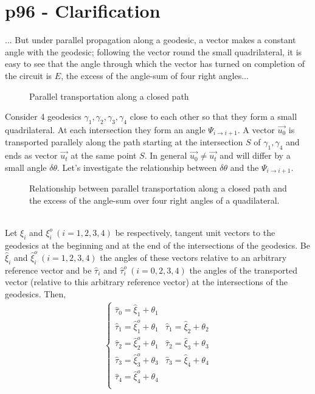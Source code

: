 \section{p96 - Clarification}
\begin{tcolorbox}
... But under parallel propagation along a geodesic, a vector makes a constant angle with the geodesic; following the vector round the small quadrilateral, it is easy to see that the angle through which the vector has turned on completion of the circuit is $E$, the excess of the angle-sum of four right angles...
\end{tcolorbox}
\begin{figure}[h]

\caption{Parallel transportation along a  closed path}
\end{figure}
Consider 4 geodesics $\gamma_{1}, \gamma_{2},\gamma_{3},\gamma_{4}$ close to each other so that they form a small quadrilateral. At each intersection they form an angle $\Psi_{i\rightarrow i+1}$. A vector $\overrightarrow{u_{0}}$ is transported parallely along the path starting at the intersection $S$ of $\gamma_{1},\gamma_{4}$ and ends as vector $\overrightarrow{u_{t}}$ at the same point $S$. In general $\overrightarrow{u_{0}}\ne \overrightarrow{u_{t}}$ and will differ by a small angle $\delta\theta$. Let's investigate the relationship between $\delta\theta$ and the $\Psi_{i\rightarrow i+1}$.\\
\begin{figure}[h]

\caption{Relationship between parallel transportation along a closed path and the excess of the angle-sum over four right angles of a quadilateral.}
\end{figure}\\
Let $\xi_{i}$ and $\xi^{o}_{i} \ (i=1,2,3,4)$ be respectively, tangent unit vectors to the  geodesics at the beginning and at the end of the intersections of the geodesics. Be $\widehat{\xi}_{i}$ and $\widehat{\xi}^{o}_{i} \ (i=1,2,3,4)$ the angles of these vectors relative to an arbitrary reference vector and be $\widehat{\tau}_{i}$ and $\widehat{\tau}^{o}_{i} \ (i=0,2,3,4)$ the angles of the transported vector (relative to this arbitrary reference vector) at the intersections of the geodesics.
Then,
\begin{align}
\left \{ \begin{array}{ll}
\widehat{\tau}_{0} = \widehat{\xi}_{1}+\theta_{1}&\\
\widehat{\tau}_{1} = \widehat{\xi}^{o}_{1}+\theta_{1}&\widehat{\tau}_{1} = \widehat{\xi}_{2}+\theta_{2}\\
\widehat{\tau}_{2} = \widehat{\xi}^{o}_{2}+\theta_{1}&\widehat{\tau}_{2} = \widehat{\xi}_{3}+\theta_{3}\\
\widehat{\tau}_{3} = \widehat{\xi}^{o}_{3}+\theta_{3}&\widehat{\tau}_{3} = \widehat{\xi}_{4}+\theta_{4}\\
\widehat{\tau}_{4} = \widehat{\xi}^{o}_{4}+\theta_{4}&\\
\end{array} \right.
\end{align}
